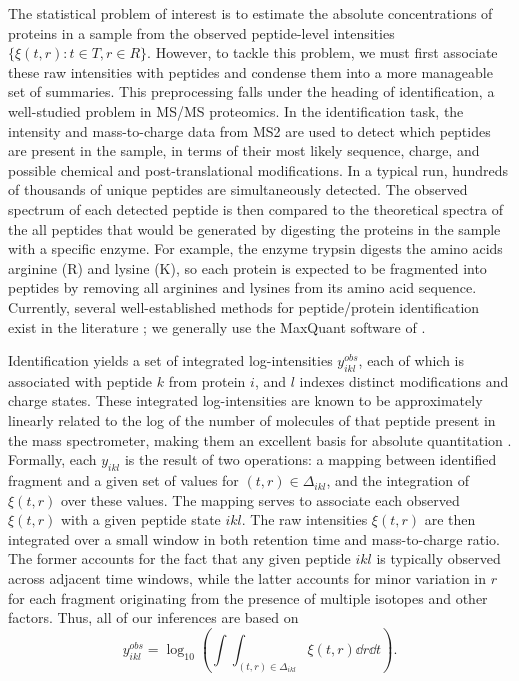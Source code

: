 
The statistical problem of interest is to estimate the absolute concentrations of proteins in a sample from the observed peptide-level intensities $\{\xi(t, r):t\in T,r\in R\}$.
However, to tackle this problem, we must first associate these raw intensities with peptides and condense them into a more manageable set of summaries.
This preprocessing falls under the heading of identification, a well-studied problem in MS/MS proteomics.
%
In the identification task, the intensity and mass-to-charge data from MS2 are used to detect which peptides are present in the sample, in terms of their most likely sequence, charge, and possible chemical and post-translational modifications.
In a typical run, hundreds of thousands of unique peptides are simultaneously detected.
The observed spectrum of each detected peptide is then compared to the theoretical spectra of the all peptides that would be generated by digesting the proteins in the sample with a specific enzyme.
For example, the enzyme trypsin digests the amino acids arginine (R) and lysine (K), so each protein is expected to be fragmented into peptides by removing all arginines and lysines from its amino acid sequence.
Currently, several well-established methods for peptide/protein identification exist in the literature \citep{Cox:2008uu,Perkins:1999ed,Eng:1994fj}; we generally use the MaxQuant software of \citet{Cox:2008uu}.

Identification yields a set of integrated log-intensities $y_{ikl}^{obs}$, each of which is associated with peptide $k$ from protein $i$, and $l$ indexes distinct modifications and charge states.
These integrated log-intensities are known to be approximately linearly related to the log of the number of molecules of that peptide present in the mass spectrometer, making them an excellent basis for absolute quantitation \citep{Old:2005jf,Scigelova:2011dt}.
Formally, each $y_{ikl}$ is the result of two operations: a mapping between identified fragment and a given set of values for $(t, r) \in \Delta_{ikl}$, and the integration of $\xi(t,r)$ over these values.
%
The mapping serves to associate each observed $\xi(t, r)$ with a given peptide state $ikl$.
The raw intensities $\xi(t, r)$ are then integrated over a small window in both retention time and mass-to-charge ratio.
The former accounts for the fact that any given peptide $ikl$ is typically observed across adjacent time windows, while the latter accounts for minor variation in $r$ for each fragment originating from the presence of multiple isotopes and other factors.
Thus, all of our inferences are based on
%
\begin{equation}
y_{ikl}^{obs} = \log_{10}\left( \int \! \int_{(t, r) \in \Delta_{ikl}} \xi(t, r) \dd r \dd t \right) .
\end{equation}

